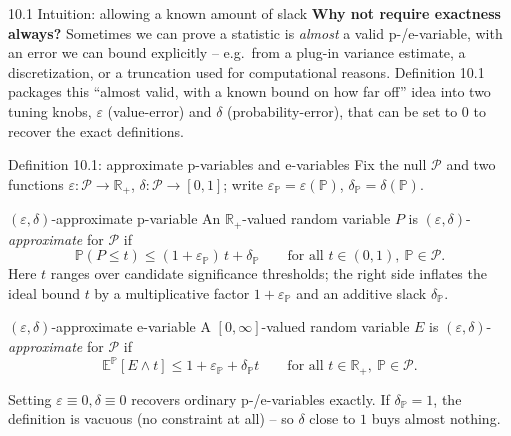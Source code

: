 \documentclass[aspectratio=169,10pt]{beamer}
\newcommand{\R}{\mathbb{R}}
\newcommand{\E}{\mathbb{E}}
\newcommand{\Pb}{\mathbb{P}}
\newcommand{\calP}{\mathcal{P}}
\begin{document}
\begin{frame}{10.1 Intuition: allowing a known amount of slack}
  \textbf{Why not require exactness always?} Sometimes we can prove a statistic is \emph{almost} a valid p-/e-variable, with an error we can bound explicitly -- e.g.\ from a plug-in variance estimate, a discretization, or a truncation used for computational reasons. Definition 10.1 packages this ``almost valid, with a known bound on how far off'' idea into two tuning knobs, $\varepsilon$ (value-error) and $\delta$ (probability-error), that can be set to $0$ to recover the exact definitions.
\end{frame}

\begin{frame}{Definition 10.1: approximate p-variables and e-variables}
  Fix the null $\calP$ and two functions $\varepsilon:\calP\to\R_+$, $\delta:\calP\to[0,1]$; write $\varepsilon_\Pb=\varepsilon(\Pb)$, $\delta_\Pb=\delta(\Pb)$.
  \begin{block}{$(\varepsilon,\delta)$-approximate p-variable}
    An $\R_+$-valued random variable $P$ is $(\varepsilon,\delta)$-\emph{approximate} for $\calP$ if
    \[
      \Pb(P\leq t) \leq (1+\varepsilon_\Pb)\,t + \delta_\Pb \qquad \text{for all } t\in(0,1),\ \Pb\in\calP.
    \]
    Here $t$ ranges over candidate significance thresholds; the right side inflates the ideal bound $t$ by a multiplicative factor $1+\varepsilon_\Pb$ and an additive slack $\delta_\Pb$.
  \end{block}
  \begin{block}{$(\varepsilon,\delta)$-approximate e-variable}
    A $[0,\infty]$-valued random variable $E$ is $(\varepsilon,\delta)$-\emph{approximate} for $\calP$ if
    \[
      \E^{\Pb}[E\wedge t] \leq 1+\varepsilon_\Pb+\delta_\Pb t \qquad \text{for all } t\in\R_+,\ \Pb\in\calP.
    \]
  \end{block}
  Setting $\varepsilon\equiv0,\delta\equiv0$ recovers ordinary p-/e-variables exactly. If $\delta_\Pb=1$, the definition is vacuous (no constraint at all) -- so $\delta$ close to $1$ buys almost nothing.
\end{frame}
\end{document}
